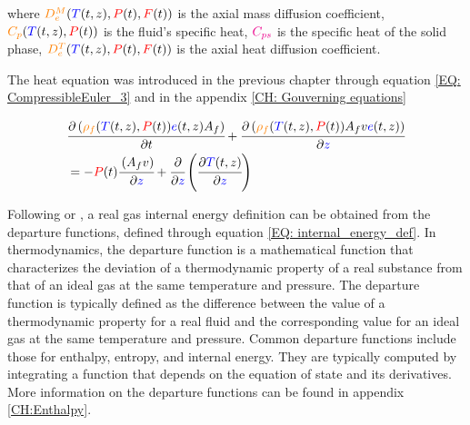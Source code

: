 \documentclass[../Article_Model_Parameters.tex]{subfiles}
\begin{document}
		where $ {\color{orange}D^M_e}({\color{blue}T}(t,z),{\color{red}P}(t),{\color{red}F}(t))$ is the axial mass diffusion coefficient, ${\color{orange}C_p}({\color{blue}T}(t,z),{\color{red}P}(t))$ is the fluid's specific heat, ${\color{magenta}C_{ps}}$ is the specific heat of the solid phase, ${\color{orange}D^T_e}({\color{blue}T}(t,z),{\color{red}P}(t),{\color{red}F}(t))$ is the axial heat diffusion coefficient. 

		\fi
		
			The heat equation was introduced in the previous chapter through equation \ref{EQ: CompressibleEuler_3} and in the appendix \ref{CH: Gouverning equations} 
			
			{\footnotesize
			\begin{align}
				&\cfrac{\partial \left( {\color{orange}\rho_f}({\color{blue}T}(t,z),{\color{red}P}(t)) {\color{blue}e}(t,z) A_f \right) }{\partial t} + \cfrac{\partial \left( {\color{orange}\rho_f}({\color{blue}T}(t,z),{\color{red}P}(t)) A_f v {\color{blue}e}(t,z) \right)}{\partial {\color{blue}z}} \nonumber \\
				&= -{\color{red}P}(t)\cfrac{\left( A_f v \right)}{\partial {\color{blue}z}} + \cfrac{\partial}{\partial {\color{blue}z}} \left( \cfrac{\partial {\color{blue}T}(t,z)}{\partial {\color{blue}z}} \right) 
			\end{align}
			}
		
			Following \citet{Elliott2011} or \citet{Gmehling2019}, a real gas internal energy definition can be obtained from the departure functions, defined through equation \ref{EQ: internal_energy_def}. In thermodynamics, the departure function is a mathematical function that characterizes the deviation of a thermodynamic property of a real substance from that of an ideal gas at the same temperature and pressure. The departure function is typically defined as the difference between the value of a thermodynamic property for a real fluid and the corresponding value for an ideal gas at the same temperature and pressure. Common departure functions include those for enthalpy, entropy, and internal energy. They are typically computed by integrating a function that depends on the equation of state and its derivatives. More information on the departure functions can be found in appendix \ref{CH:Enthalpy}.
\end{document}
